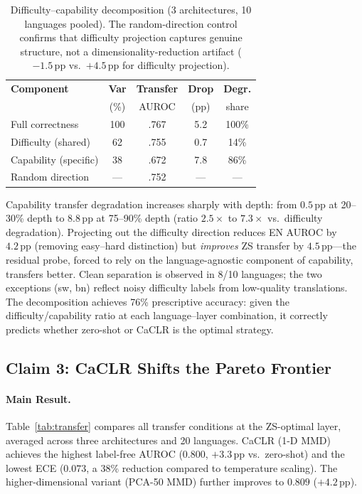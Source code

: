 \documentclass[11pt,a4paper]{article}
\newcommand{\pp}{\,\text{pp}}
\newcommand{\caclr}{CaCLR}
\begin{document}
\begin{table}[t]
\centering
\small
\begin{tabular}{@{}lcccc@{}}
\toprule
\textbf{Component} & \textbf{Var} & \textbf{Transfer} & \textbf{Drop} & \textbf{Degr.} \\
 & (\%) & AUROC & (pp) & share \\
\midrule
Full correctness & 100 & .767 & 5.2 & 100\% \\
Difficulty (shared) & 62 & .755 & 0.7 & 14\% \\
Capability (specific) & 38 & .672 & 7.8 & 86\% \\
Random direction & --- & .752 & --- & --- \\
\bottomrule
\end{tabular}
\caption{Difficulty--capability decomposition (3 architectures, 10 languages pooled). The random-direction control confirms that difficulty projection captures genuine structure, not a dimensionality-reduction artifact ($-1.5\pp$ vs.\ $+4.5\pp$ for difficulty projection).}
\label{tab:decomp}
\end{table}

Capability transfer degradation increases sharply with depth: from $0.5\pp$ at 20--30\% depth to $8.8\pp$ at 75--90\% depth (ratio $2.5{\times}$ to $7.3{\times}$ vs.\ difficulty degradation).
Projecting out the difficulty direction reduces EN AUROC by $4.2\pp$ (removing easy--hard distinction) but \emph{improves} ZS transfer by $4.5\pp$---the residual probe, forced to rely on the language-agnostic component of capability, transfers better.
Clean separation is observed in 8/10 languages; the two exceptions (sw, bn) reflect noisy difficulty labels from low-quality translations.
The decomposition achieves 76\% prescriptive accuracy: given the difficulty/capability ratio at each language--layer combination, it correctly predicts whether zero-shot or \caclr{} is the optimal strategy.

\subsection{Claim 3: \caclr{} Shifts the Pareto Frontier}
\label{sec:caclr_results}

\paragraph{Main Result.}
Table~\ref{tab:transfer} compares all transfer conditions at the ZS-optimal layer, averaged across three architectures and 20 languages.
\caclr{} (1-D MMD) achieves the highest label-free AUROC ($0.800$, $+3.3\pp$ vs.\ zero-shot) and the lowest ECE ($0.073$, a 38\% reduction compared to temperature scaling).
The higher-dimensional variant (PCA-50 MMD) further improves to $0.809$ ($+4.2\pp$).
\end{document}
